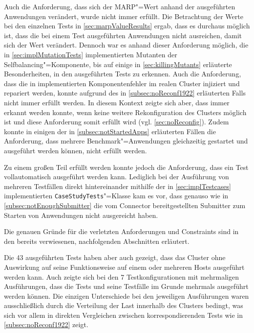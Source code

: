 Auch die Anforderung, dass sich der MARP"=Wert anhand der ausgeführten Anwendungen verändert, wurde nicht immer erfüllt.
Die Betrachtung der Werte bei den einzelnen Tests in \cref{sec:marpValueResults} ergab, dass es durchaus möglich ist, dass die bei einem Test ausgeführten Anwendungen nicht ausreichen, damit sich der Wert verändert.
Dennoch war es anhand dieser Anforderung möglich, die in \cref{sec:implMutationTests} implementierten Mutanten der Selfbalancing"=Komponente, bis auf einige in \cref{sec:killingMutants} erläuterte Besonderheiten, in den ausgeführten Tests zu erkennen.
Auch die Anforderung, dass die in  implementierten Komponentenfehler im realen Cluster injiziert und repariert werden, konnte aufgrund des in \cref{subsec:noReconf1922} erläuterten Falls nicht immer erfüllt werden.
In diesem Kontext zeigte sich aber, dass immer erkannt werden konnte, wenn keine weitere Rekonfiguration des Clusters möglich ist und diese Anforderung somit erfüllt wird (vgl. \cref{sec:noReconfig}).
Zudem konnte in einigen der in \cref{subsec:notStartedApps} erläuterten Fällen die Anforderung, dass mehrere Benchmark"=Anwendungen gleichzeitig gestartet und ausgeführt werden können, nicht erfüllt werden.

Zu einem großen Teil erfüllt werden konnte jedoch die Anforderung, dass ein Test vollautomatisch ausgeführt werden kann.
Lediglich bei der Ausführung von mehreren Testfällen direkt hintereinander mithilfe der in \cref{sec:implTestcases} implementierten \texttt{CaseStudyTests}"=Klasse kam es vor, dass genauso wie in \cref{subsec:notEnoughSubmitter} die vom Connector bereitgestellten Submitter zum Starten von Anwendungen nicht ausgereicht haben.

Die genauen Gründe für die verletzten Anforderungen und Constraints sind in den bereits verwiesenen, nachfolgenden Abschnitten erläutert.

Die 43 ausgeführten Tests haben aber auch gezeigt, dass das Cluster ohne Auswirkung auf seine Funktionsweise auf einem oder mehreren Hosts ausgeführt werden kann.
Auch zeigte sich bei den 7 Testkonfigurationen mit mehrmaligen Ausführungen, dass die Tests und seine Testfälle im Grunde mehrmals ausgeführt werden können.
Die einzigen Unterschiede bei den jeweiligen Ausführungen waren ausschließlich durch die Verteilung der Last innerhalb des Clusters bedingt, was sich vor allem in direkten Vergleichen zwischen korrespondierenden Tests wie \zB in \cref{subsec:noReconf1922} zeigt.
